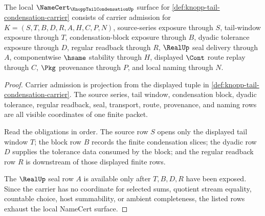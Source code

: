 \begin{theorem}
\label{thm:knopp-tail-condensation-namecert-obligations}
The local $\NameCert_{\KnoppTailCondensationUp}$ surface for \autoref{def:knopp-tail-condensation-carrier} consists of carrier admission for $K=(S,T,B,D,R,A,H,C,P,N)$, source-series exposure through $S$, tail-window exposure through $T$, condensation-block exposure through $B$, dyadic tolerance exposure through $D$, regular readback through $R$, $\RealUp$ seal delivery through $A$, componentwise $\hsame$ stability through $H$, displayed $\Cont$ route replay through $C$, $\Pkg$ provenance through $P$, and local naming through $N$.
\end{theorem}
\begin{proof}
Carrier admission is projection from the displayed tuple in \autoref{def:knopp-tail-condensation-carrier}. The source series, tail window, condensation block, dyadic tolerance, regular readback, seal, transport, route, provenance, and naming rows are all visible coordinates of one finite packet.

Read the obligations in order. The source row $S$ opens only the displayed tail window $T$; the block row $B$ records the finite condensation slices; the dyadic row $D$ supplies the tolerance data consumed by the block; and the regular readback row $R$ is downstream of those displayed finite rows.

The $\RealUp$ seal row $A$ is available only after $T,B,D,R$ have been exposed. Since the carrier has no coordinate for selected sums, quotient stream equality, countable choice, host summability, or ambient completeness, the listed rows exhaust the local NameCert surface.
\end{proof}

